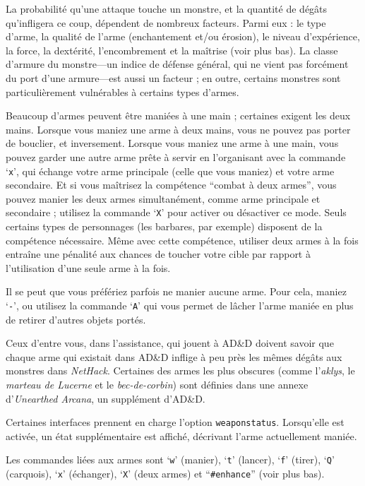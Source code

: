 \documentclass[titlepage]{article}
\begin{document}
La probabilité qu'une attaque touche un monstre, et la quantité
de dégâts qu'infligera ce coup, dépendent de nombreux facteurs.  Parmi eux :
le type d'arme, la qualité de l'arme (enchantement et/ou érosion), le niveau
d'expérience, la force, la dextérité, l'encombrement et la maîtrise (voir plus bas).  La
classe d'armure
du monstre---un indice de défense général, qui ne vient pas forcément du port d'une armure---est
aussi un facteur ; en outre, certains monstres sont particulièrement
vulnérables à certains types d'armes.

Beaucoup d'armes peuvent être maniées à une main ; certaines exigent les deux mains.
Lorsque vous maniez une arme à deux mains, vous ne pouvez pas porter de bouclier, et
inversement.  Lorsque vous maniez une arme à une main, vous pouvez garder une autre
arme prête à servir en l'organisant avec la commande `\texttt{x}', qui
échange votre arme principale (celle que vous maniez) et votre arme secondaire.
Et si vous maîtrisez la compétence ``combat à deux armes'', vous
pouvez manier les deux armes simultanément, comme arme principale et secondaire ;
utilisez la commande `\texttt{X}' pour activer ou désactiver ce mode.
Seuls certains types de personnages (les barbares, par exemple) disposent de la
compétence nécessaire.  Même avec cette compétence, utiliser deux armes à la fois entraîne
une pénalité aux chances de toucher votre cible par rapport à l'utilisation d'une
seule arme à la fois.

Il se peut que vous préfériez parfois ne manier aucune arme.
Pour cela, maniez `\texttt{-}', ou utilisez la commande `\texttt{A}' qui
vous permet de lâcher l'arme maniée en plus de retirer
d'autres objets portés.

Ceux d'entre vous, dans l'assistance, qui jouent à AD\&D doivent savoir que chaque
arme qui existait dans AD\&D inflige à peu près les mêmes dégâts aux monstres dans
\textit{NetHack}.  Certaines des armes les plus obscures (comme
l'\textit{aklys}, le \textit{marteau de Lucerne} et le \textit{bec-de-corbin}) sont définies
dans une annexe d'\textit{Unearthed Arcana}, un supplément d'AD\&D.

Certaines interfaces prennent en charge l'option \texttt{weaponstatus}.
Lorsqu'elle est activée, un état supplémentaire est affiché, décrivant
l'arme actuellement maniée.

Les commandes liées aux armes sont `\texttt{w}' (manier), `\texttt{t}' (lancer),
`\texttt{f}' (tirer), `\texttt{Q}' (carquois),
`\texttt{x}' (échanger), `\texttt{X}' (deux armes) et ``\texttt{\#enhance}''
(voir plus bas).
\end{document}
